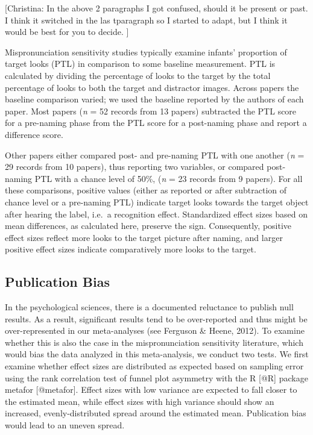 \documentclass[man]{apa6}
\theoremstyle{definition}
\theoremstyle{definition}
\theoremstyle{definition}
\theoremstyle{remark}
\begin{document}
{[}Christina: In the above 2 paragraphs I got confused, should it be
present or past. I think it switched in the las tparagraph so I started
to adapt, but I think it would be best for you to decide. {]}

Mispronunciation sensitivity studies typically examine infants'
proportion of target looks (PTL) in comparison to some baseline
measurement. PTL is calculated by dividing the percentage of looks to
the target by the total percentage of looks to both the target and
distractor images. Across papers the baseline comparison varied; we used
the baseline reported by the authors of each paper. Most papers
(\emph{n} = 52 records from 13 papers) subtracted the PTL score for a
pre-naming phase from the PTL score for a post-naming phase and report a
difference score.

Other papers either compared post- and pre-naming PTL with one another
(\emph{n} = 29 records from 10 papers), thus reporting two variables, or
compared post-naming PTL with a chance level of 50\%, (\emph{n} = 23
records from 9 papers). For all these comparisons, positive values
(either as reported or after subtraction of chance level or a pre-naming
PTL) indicate target looks towards the target object after hearing the
label, i.e.~a recognition effect. Standardized effect sizes based on
mean differences, as calculated here, preserve the sign. Consequently,
positive effect sizes reflect more looks to the target picture after
naming, and larger positive effect sizes indicate comparatively more
looks to the target.

\subsection{Publication Bias}\label{publication-bias}

In the psychological sciences, there is a documented reluctance to
publish null results. As a result, significant results tend to be
over-reported and thus might be over-represented in our meta-analyses
(see Ferguson \& Heene, 2012). To examine whether this is also the case
in the mispronunciation sensitivity literature, which would bias the
data analyzed in this meta-analysis, we conduct two tests. We first
examine whether effect sizes are distributed as expected based on
sampling error using the rank correlation test of funnel plot asymmetry
with the R {[}@R{]} package metafor {[}@metafor{]}. Effect sizes with
low variance are expected to fall closer to the estimated mean, while
effect sizes with high variance should show an increased,
evenly-distributed spread around the estimated mean. Publication bias
would lead to an uneven spread.
\end{document}
